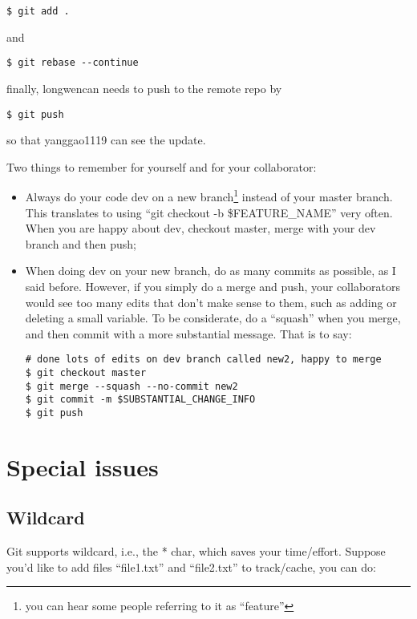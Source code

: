 \documentclass{article} %
\newcommand{\q}[1]{``#1''}
\begin{document}
\begin{lstlisting}
$ git add .
\end{lstlisting}

and 

\begin{lstlisting}
$ git rebase --continue
\end{lstlisting}

finally, longwencan needs to push to the remote repo by

\begin{lstlisting}
$ git push
\end{lstlisting}

so that yanggao1119 can see the update.

Two things to remember for yourself and for your collaborator:

\begin{itemize}
\item Always do your code dev on a new branch\footnote{you can hear some people referring to it as \q{feature} } instead of your master branch. This translates to using \q{git checkout -b \$FEATURE\_NAME} very often. When you are happy about dev, checkout master, merge with your dev branch and then push;
\item When doing dev on your new branch, do as many commits as possible, as I said before. However, if you simply do a merge and push, your collaborators would see too many edits that don't make sense to them, such as adding or deleting a small variable. To be considerate, do a \q{squash} when you merge, and then commit with a more substantial message. That is to say:

\begin{lstlisting}
# done lots of edits on dev branch called new2, happy to merge
$ git checkout master
$ git merge --squash --no-commit new2
$ git commit -m $SUBSTANTIAL_CHANGE_INFO
$ git push
\end{lstlisting}

\end{itemize}


\section{Special issues}

\subsection{Wildcard}

Git supports wildcard, i.e., the * char, which saves your time/effort. Suppose you'd like to add files \q{file1.txt} and \q{file2.txt} to track/cache, you can do:
\end{document}
